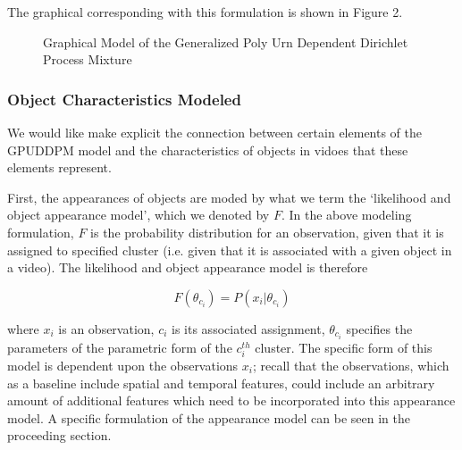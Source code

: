 \documentclass{article}
\begin{document}
The graphical corresponding with this formulation is shown in Figure 2.

\begin{figure}[h]
        \caption{\label{Figure 2:} Graphical Model of the Generalized Poly Urn Dependent Dirichlet Process Mixture}
\end{figure}







\subsubsection{Object Characteristics Modeled}

We would like make explicit the connection between certain elements of the GPUDDPM model and the characteristics of objects in vidoes that these elements represent.

First, the appearances of objects are moded by what we term the `likelihood and object appearance model', which we denoted by $F$. In the above modeling formulation, $F$ is the probability distribution for an observation, given that it is assigned to specified cluster (i.e. given that it is associated with a given object in a video). The likelihood and object appearance model is therefore

\begin{equation}
F(\theta_{c_{i}}) = P(x_{i}|\theta_{c_{i}})
\end{equation}

where $x_{i}$ is an observation, $c_{i}$ is its associated assignment, $\theta_{c_{i}}$ specifies the parameters of the parametric form of the $c_{i}^{th}$ cluster. The specific form of this model is dependent upon the observations $x_{i}$; recall that the observations, which as a baseline include spatial and temporal features, could include an arbitrary amount of additional features which need to be incorporated into this appearance model. A specific formulation of the appearance model can be seen in the proceeding section.
\end{document}
